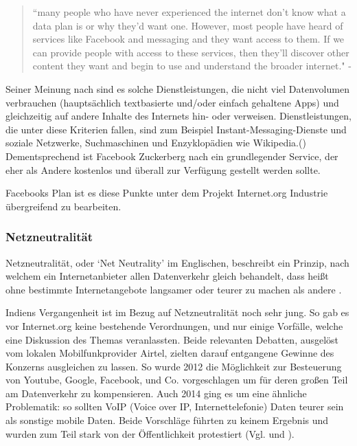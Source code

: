\documentclass{article}
\begin{document}
\begin{quote}
``many people who have never experienced the internet don’t know what a data plan is or why they’d want one. 
However, most people have heard of services like Facebook and messaging and they want access to them. If we can provide people 
with access to these services, then they’ll discover other content they want and begin to use 
and understand the broader internet." - \textcite[4]{HumanRight}
\end{quote}

Seiner Meinung nach sind es solche Dienstleistungen, die nicht viel Datenvolumen verbrauchen (hauptsächlich textbasierte und/oder einfach gehaltene Apps) und gleichzeitig auf andere Inhalte des Internets hin- oder verweisen.
Dienstleistungen, die unter diese Kriterien fallen, sind zum Beispiel Instant-Messaging-Dienste und soziale Netzwerke, Suchmaschinen und Enzyklopädien wie Wikipedia.(\cite[5]{HumanRight})
Dementsprechend ist Facebook Zuckerberg nach ein grundlegender Service, der eher als Andere kostenlos und überall zur Verfügung gestellt werden sollte.

\medskip

Facebooks Plan ist es diese Punkte unter dem Projekt Internet.org Industrie übergreifend zu bearbeiten.

\subsubsection{Netzneutralität}

Netzneutralität, oder `Net Neutrality' im Englischen, beschreibt ein Prinzip, nach welchem ein Internetanbieter allen Datenverkehr gleich behandelt, dass heißt ohne bestimmte Internetangebote langsamer oder teurer zu machen als andere \autocite{netzneutralität}.

\medskip

Indiens Vergangenheit ist im Bezug auf Netzneutralität noch sehr jung. So gab es vor Internet.org keine bestehende Verordnungen, und nur einige Vorfälle, welche eine Diskussion des Themas veranlassten.
Beide relevanten Debatten, ausgelöst vom lokalen Mobilfunkprovider Airtel, zielten darauf entgangene Gewinne des Konzerns ausgleichen zu lassen.
So wurde 2012 die Möglichkeit zur Besteuerung von Youtube, Google, Facebook, und Co. vorgeschlagen um für deren großen Teil am Datenverkehr zu kompensieren.
Auch 2014 ging es um eine ähnliche Problematik: so sollten VoIP (Voice over IP, Internettelefonie) Daten teurer sein als sonstige mobile Daten.
Beide Vorschläge führten zu keinem Ergebnis und wurden zum Teil stark von der Öffentlichkeit protestiert (Vgl. \textcite[253]{everydayLife} und \textcite{airtelVoip}).
\end{document}
